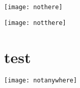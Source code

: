 \documentclass{article}
\begin{document}
\texttt{[image: nothere]}

\texttt{[image: notthere]}

\section{test}

\texttt{[image: notanywhere]}
\end{document}
